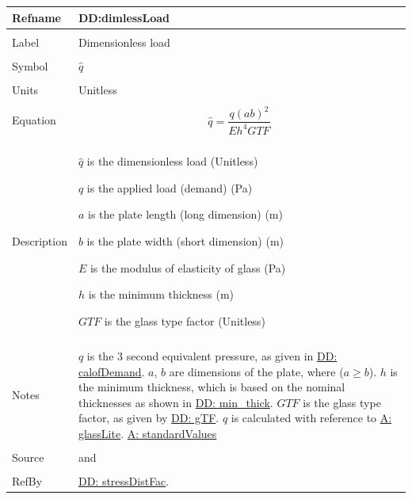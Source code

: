 \documentclass[12pt]{article}
\begin{document}
\noindent \begin{minipage}{\textwidth}
\begin{tabular}{p{} p{}}
\toprule \textbf{Refname} & \textbf{DD:dimlessLoad}
\label{DD:dimlessLoad}
\\ \midrule \\
Label & Dimensionless load
\\ \midrule \\
Symbol & $\hat{q}$
\\ \midrule \\
Units & Unitless
\\ \midrule \\
Equation & \begin{displaymath}
           \hat{q}=\frac{q \left(a b\right)^{2}}{E h^{4} GTF}
           \end{displaymath}
\\ \midrule \\
Description & \begin{symbDescription}
              \item{$\hat{q}$ is the dimensionless load (Unitless)}
              \item{$q$ is the applied load (demand) (Pa)}
              \item{$a$ is the plate length (long dimension) (m)}
              \item{$b$ is the plate width (short dimension) (m)}
              \item{$E$ is the modulus of elasticity of glass (Pa)}
              \item{$h$ is the minimum thickness (m)}
              \item{$GTF$ is the glass type factor (Unitless)}
              \end{symbDescription}
\\ \midrule \\
Notes & $q$ is the 3 second equivalent pressure, as given in \hyperref[DD:calofDemand]{DD: calofDemand}.
        $a$, $b$ are dimensions of the plate, where ($a\geq{}b$).
        $h$ is the minimum thickness, which is based on the nominal thicknesses as shown in \hyperref[DD:min.thick]{DD: min\_thick}.
        $GTF$ is the glass type factor, as given by \hyperref[DD:gTF]{DD: gTF}.
        $\hat{q}$ is calculated with reference to \hyperref[assumpGL]{A: glassLite}.
        \hyperref[assumpSV]{A: standardValues}
\\ \midrule \\
Source & \cite{astm2009} and \cite{campidelli}
\\ \midrule \\
RefBy & \hyperref[DD:stressDistFac]{DD: stressDistFac}.
\\ \bottomrule \end{tabular}
\end{minipage}
\par~
\end{document}
